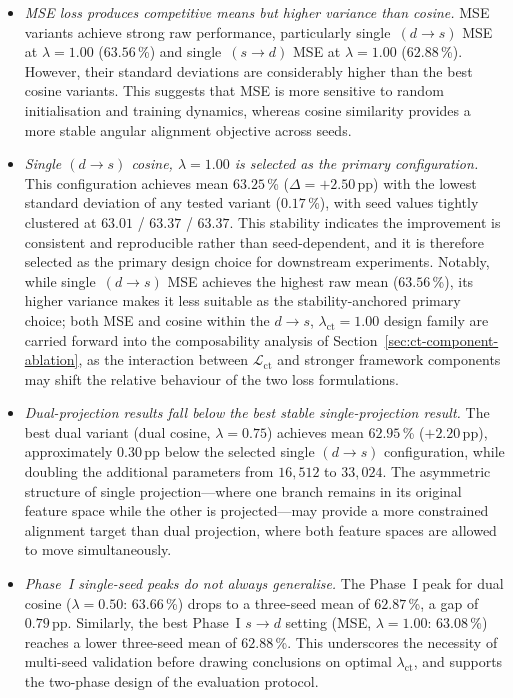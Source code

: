 \begin{itemize}
\item \textit{MSE loss produces competitive means but higher variance
  than cosine.}
  MSE variants achieve strong raw performance, particularly
  single~$(d{\rightarrow}s)$ MSE at $\lambda=1.00$ ($63.56$\,\%) and
  single~$(s{\rightarrow}d)$ MSE at $\lambda=1.00$ ($62.88$\,\%).
  However, their standard deviations are considerably higher than the
  best cosine variants. This suggests that MSE is more sensitive to
  random initialisation and training dynamics, whereas cosine similarity
  provides a more stable angular alignment objective across seeds.

\item \textit{Single $(d{\rightarrow}s)$ cosine, $\lambda=1.00$ is
  selected as the primary configuration.}
  This configuration achieves mean $63.25$\,\% ($\Delta=+2.50$\,pp)
  with the lowest standard deviation of any tested variant ($0.17$\,\%),
  with seed values tightly clustered at $63.01$ / $63.37$ / $63.37$.
  This stability indicates the improvement is consistent and
  reproducible rather than seed-dependent, and it is therefore
  selected as the primary design choice for downstream experiments.
  Notably, while single~$(d{\rightarrow}s)$ MSE achieves the highest
  raw mean ($63.56$\,\%), its higher variance makes it less suitable as
  the stability-anchored primary choice; both MSE and cosine within the
  $d{\rightarrow}s$, $\lambda_\text{ct}=1.00$ design family are
  carried forward into the composability analysis of
  Section~\ref{sec:ct-component-ablation}, as the interaction between
  $\mathcal{L}_\text{ct}$ and stronger framework components may shift
  the relative behaviour of the two loss formulations.

\item \textit{Dual-projection results fall below the best stable
  single-projection result.}
  The best dual variant (dual cosine, $\lambda=0.75$) achieves mean
  $62.95$\,\% ($+2.20$\,pp), approximately $0.30$\,pp below the
  selected single $(d{\rightarrow}s)$ configuration, while doubling
  the additional parameters from $16{,}512$ to $33{,}024$.
  The asymmetric structure of single projection---where one branch
  remains in its original feature space while the other is projected---may
  provide a more constrained alignment target than dual projection, where
  both feature spaces are allowed to move simultaneously.

\item \textit{Phase~I single-seed peaks do not always generalise.}
  The Phase~I peak for dual cosine ($\lambda=0.50$: $63.66$\,\%)
  drops to a three-seed mean of $62.87$\,\%, a gap of $0.79$\,pp.
  Similarly, the best Phase~I $s{\rightarrow}d$ setting
  (MSE, $\lambda=1.00$: $63.08$\,\%) reaches a lower three-seed mean
  of $62.88$\,\%. This underscores the necessity of multi-seed
  validation before drawing conclusions on optimal $\lambda_\text{ct}$,
  and supports the two-phase design of the evaluation protocol.

\end{itemize}


